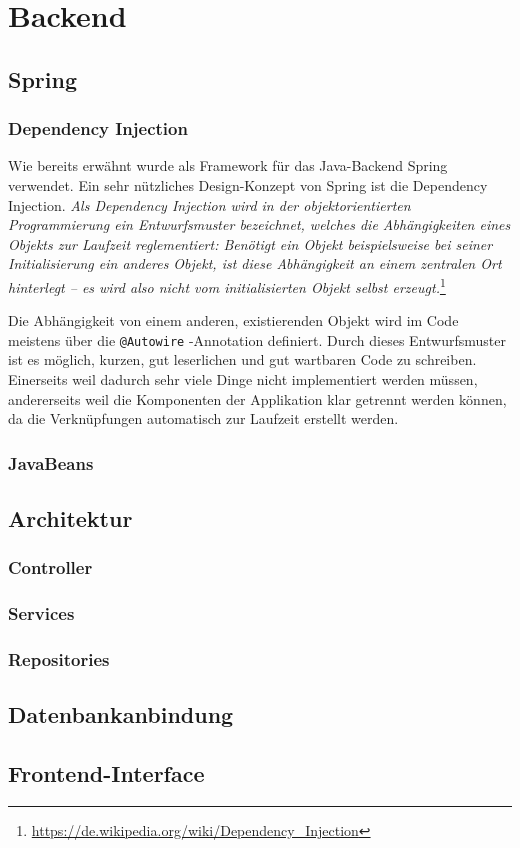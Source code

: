 \section{Backend}

\subsection{Spring}

\subsubsection{Dependency Injection}

Wie bereits erwähnt wurde als Framework für das Java-Backend Spring verwendet. Ein sehr nützliches Design-Konzept von Spring ist die Dependency Injection. 
\vspace{5mm}\newline
\textit{Als Dependency Injection wird in der objektorientierten Programmierung ein Entwurfsmuster bezeichnet, welches die Abhängigkeiten eines Objekts zur Laufzeit reglementiert: Benötigt ein Objekt beispielsweise bei seiner Initialisierung ein anderes Objekt, ist diese Abhängigkeit an einem zentralen Ort hinterlegt – es wird also nicht vom initialisierten Objekt selbst erzeugt.}\footnote{\url{https://de.wikipedia.org/wiki/Dependency_Injection}}
\vspace{5mm}

Die Abhängigkeit von einem anderen, existierenden Objekt wird im Code meistens über die \verb|@Autowire| -Annotation definiert. Durch dieses Entwurfsmuster ist es möglich, kurzen, gut leserlichen und gut wartbaren Code zu schreiben. Einerseits weil dadurch sehr viele Dinge nicht implementiert werden müssen, andererseits weil die Komponenten der Applikation klar getrennt werden können, da die Verknüpfungen automatisch zur Laufzeit erstellt werden.

\subsubsection{JavaBeans}

\subsection{Architektur}

\subsubsection{Controller}

\subsubsection{Services}

\subsubsection{Repositories}

\subsection{Datenbankanbindung}

\subsection{Frontend-Interface}